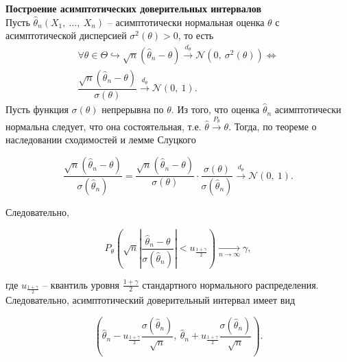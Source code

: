 \textbf{Построение асимптотических доверительных интервалов}\\

Пусть $\displaystyle \hat{\theta }_{n}( X_{1} ,\ \dotsc ,\ X_{n})$ -- асимптотически нормальная оценка $\displaystyle \theta $ с асимптотической дисперсией $\displaystyle \sigma ^{2}( \theta )  >0$, то есть
\begin{gather*}
    \forall \theta \in \Theta \hookrightarrow \sqrt{n}(\hat{\theta }_{n} -\theta )\xrightarrow{d_{\theta }}\mathcal{N}\left( 0,\ \sigma ^{2}( \theta )\right) \Leftrightarrow \\
    \dfrac{\sqrt{n}(\hat{\theta }_{n} -\theta )}{\sigma ( \theta )}\xrightarrow{d_{\theta }}\mathcal{N}( 0,\ 1) .
\end{gather*}
Пусть функция $\displaystyle \sigma ( \theta )$ непрерывна по $\displaystyle \theta $. Из того, что оценка $\displaystyle \hat{\theta }_{n}$ асимптотически нормальна следует, что она состоятельная, т.е. $\displaystyle \hat{\theta }\xrightarrow{P_{\theta }} \theta $. Тогда, по теореме о наследовании сходимостей и лемме Слуцкого


\begin{equation*}
    \dfrac{\sqrt{n}(\hat{\theta }_{n} -\theta )}{\sigma (\hat{\theta }_{n})} =\dfrac{\sqrt{n}(\hat{\theta }_{n} -\theta )}{\sigma ( \theta )} \cdotp \dfrac{\sigma ( \theta )}{\sigma (\hat{\theta }_{n})}\xrightarrow{d_{\theta }}\mathcal{N}( 0,\ 1) .
\end{equation*}


Следовательно,


\begin{equation*}
    P_{\theta }\left(\sqrt{n}\left| \dfrac{\hat{\theta }_{n} -\theta }{\sigma (\hat{\theta }_{n})}\right| < u_{\frac{1+\gamma }{2}}\right)\xrightarrow[n\rightarrow \infty ]{} \gamma ,
\end{equation*}


где $\displaystyle u_{\frac{1+\gamma }{2}}$ -- квантиль уровня $\displaystyle \frac{1+\gamma }{2}$ стандартного нормального распределения. Следовательно, асимптотический доверительный интервал имеет вид


\begin{equation*}
    \left(\hat{\theta }_{n} -u_{\frac{1+\gamma }{2}}\dfrac{\sigma (\hat{\theta }_{n})}{\sqrt{n}} ,\ \hat{\theta }_{n} +u_{\frac{1+\gamma }{2}}\dfrac{\sigma (\hat{\theta }_{n})}{\sqrt{n}}\right) .
\end{equation*}
